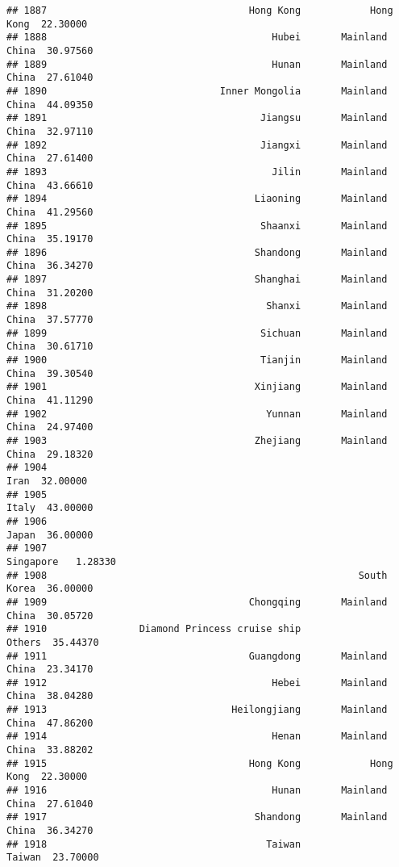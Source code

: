 \documentclass[
]{article}
\begin{document}
\begin{verbatim}
## 1887                                   Hong Kong            Hong Kong  22.30000
## 1888                                       Hubei       Mainland China  30.97560
## 1889                                       Hunan       Mainland China  27.61040
## 1890                              Inner Mongolia       Mainland China  44.09350
## 1891                                     Jiangsu       Mainland China  32.97110
## 1892                                     Jiangxi       Mainland China  27.61400
## 1893                                       Jilin       Mainland China  43.66610
## 1894                                    Liaoning       Mainland China  41.29560
## 1895                                     Shaanxi       Mainland China  35.19170
## 1896                                    Shandong       Mainland China  36.34270
## 1897                                    Shanghai       Mainland China  31.20200
## 1898                                      Shanxi       Mainland China  37.57770
## 1899                                     Sichuan       Mainland China  30.61710
## 1900                                     Tianjin       Mainland China  39.30540
## 1901                                    Xinjiang       Mainland China  41.11290
## 1902                                      Yunnan       Mainland China  24.97400
## 1903                                    Zhejiang       Mainland China  29.18320
## 1904                                                             Iran  32.00000
## 1905                                                            Italy  43.00000
## 1906                                                            Japan  36.00000
## 1907                                                        Singapore   1.28330
## 1908                                                      South Korea  36.00000
## 1909                                   Chongqing       Mainland China  30.05720
## 1910                Diamond Princess cruise ship               Others  35.44370
## 1911                                   Guangdong       Mainland China  23.34170
## 1912                                       Hebei       Mainland China  38.04280
## 1913                                Heilongjiang       Mainland China  47.86200
## 1914                                       Henan       Mainland China  33.88202
## 1915                                   Hong Kong            Hong Kong  22.30000
## 1916                                       Hunan       Mainland China  27.61040
## 1917                                    Shandong       Mainland China  36.34270
## 1918                                      Taiwan               Taiwan  23.70000

\end{verbatim}
\end{document}
